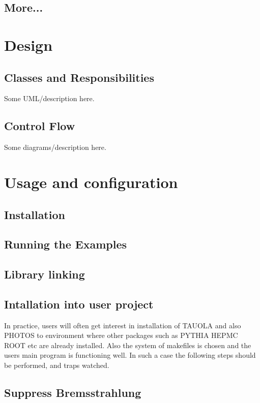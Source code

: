 \documentclass[]{Photos_interface_design}
\begin{document}
\subsection{More...}


\section{Design}

\subsection{Classes and Responsibilities}
Some UML/description here.
\subsection{Control Flow}
Some diagrams/description here.


\section{Usage and configuration}
\subsection{Installation}
\subsection{Running the Examples}
\subsection{Library linking}
\subsection{Intallation into user project}
In practice, users will often get interest in installation of TAUOLA
and also PHOTOS to environment where other packages such as PYTHIA HEPMC ROOT
 etc are already installed. Also the system of makefiles is chosen and 
the users main program is functioning well. In such a case the following 
steps should be performed, and traps watched.


\subsection{Suppress Bremsstrahlung}
\end{document}
